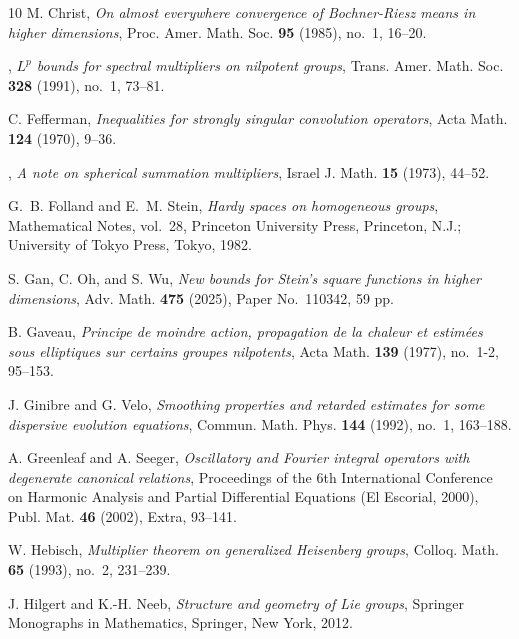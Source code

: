 \documentclass[leqno]{amsart}
\theoremstyle{definition}
\theoremstyle{remark}
\numberwithin{equation}{section}
\begin{document}
\begin{thebibliography}{10}
M. Christ, \emph{On almost everywhere convergence of {B}ochner-{R}iesz
  means in higher dimensions}, Proc. Amer. Math. Soc. \textbf{95} (1985),
  no.~1, 16--20. 

\bysame, \emph{{$L^p$} bounds for spectral multipliers on nilpotent groups},
  Trans. Amer. Math. Soc. \textbf{328} (1991), no.~1, 73--81.

C. Fefferman, \emph{Inequalities for strongly singular convolution
  operators}, Acta Math. \textbf{124} (1970), 9--36. 

\bysame, \emph{A note on spherical summation multipliers}, Israel J. Math.
  \textbf{15} (1973), 44--52. 

G.~B. Folland and E.~M. Stein, \emph{Hardy spaces on homogeneous
  groups}, Mathematical Notes, vol.~28, Princeton University Press,
  Princeton, N.J.; University of Tokyo Press, Tokyo, 1982. 

S. Gan, C. Oh, and S. Wu, \emph{New bounds for {S}tein's square functions
  in higher dimensions}, Adv. Math. \textbf{475} (2025), Paper No.~110342,
  59 pp. 

B. Gaveau, \emph{Principe de moindre action, propagation de la chaleur et
  estimées sous elliptiques sur certains groupes nilpotents}, Acta Math.
  \textbf{139} (1977), no.~1-2, 95--153. 
  
J. Ginibre and G. Velo, \emph{Smoothing properties and retarded estimates
  for some dispersive evolution equations}, Commun. Math. Phys.
  \textbf{144} (1992), no.~1, 163--188.

A. Greenleaf and A. Seeger, \emph{Oscillatory and {F}ourier integral
  operators with degenerate canonical relations}, Proceedings of the 6th
  International Conference on Harmonic Analysis and Partial Differential
  Equations (El Escorial, 2000), Publ. Mat. \textbf{46} (2002), Extra,
  93--141. 

W. Hebisch, \emph{Multiplier theorem on generalized {H}eisenberg groups},
  Colloq. Math. \textbf{65} (1993), no.~2, 231--239. 

J. Hilgert and K.-H. Neeb, \emph{Structure and geometry of {L}ie
  groups}, Springer Monographs in Mathematics, Springer, New York, 2012.


\end{thebibliography}
\end{document}
